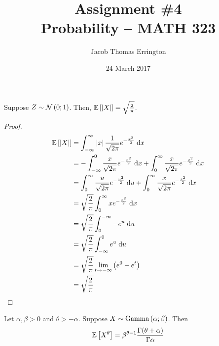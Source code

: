 \documentclass[11pt]{article}
\author{Jacob Thomas Errington}
\title{Assignment \#4\\Probability -- MATH 323}
\date{24 March 2017}
\begin{document}
\maketitle


\begin{prop}
    Suppose $Z \sim \operatorname{\mathcal{N}}\left(0;1\right)$.
    Then, $\operatorname{\mathbb{E}}{\left[\left\lvert X\right\rvert\right]} = \sqrt{\frac{2}{\pi}}$.
\end{prop}

\begin{proof}
    \begin{align*}
        \operatorname{\mathbb{E}}{\left[\left\lvert X\right\rvert\right]}
        &= \int_{-\infty}^{\infty} {
            \left\lvert x\right\rvert \frac{1}{\sqrt{2 \pi}} e^{- \frac{x^2}{2}} \;\mathrm{d} x
        } \\
        &= - \int_{-\infty}^0 \frac{x}{\sqrt{2 \pi}} e^{-\frac{x^2}{2}} \;\mathrm{d} x
            + \int^{\infty}_0 \frac{x}{\sqrt{2 \pi}} e^{-\frac{x^2}{2}} \;\mathrm{d} x \\
        &= \int^{\infty}_0 \frac{u}{\sqrt{2\pi}} e^{-\frac{u^2}{2}} \;\mathrm{d} u
            + \int^{\infty}_0 \frac{x}{\sqrt{2 \pi}} e^{-\frac{x^2}{2}} \;\mathrm{d} x \\
        &= \sqrt{\frac{2}{\pi}} \int^{\infty}_0 x e^{-\frac{x^2}{2}} \;\mathrm{d} x \\
        &= \sqrt{\frac{2}{\pi}} \int_0^{-\infty} - e^u \;\mathrm{d} u \\
        &= \sqrt{\frac{2}{\pi}} \int_{-\infty}^0 e^u \;\mathrm{d} u \\
        &= \sqrt{\frac{2}{\pi}} \lim_{t\to -\infty} \left(e^0 - e^t\right) \\
        &= \sqrt{\frac{2}{\pi}}
    \end{align*}
\end{proof}

\begin{prop}
    Let $\alpha, \beta > 0$ and $\theta > -\alpha$.
    Suppose $X \sim \operatorname{Gamma}\left(\alpha;\beta\right)$.
    Then
    \begin{equation*}
        \operatorname{\mathbb{E}}{\left[X^\theta\right]}
        = \beta^{\theta - 1}
            \frac{\Gamma(\theta + \alpha)}{\Gamma{\alpha}}
    \end{equation*}
\end{prop}
\end{document}
